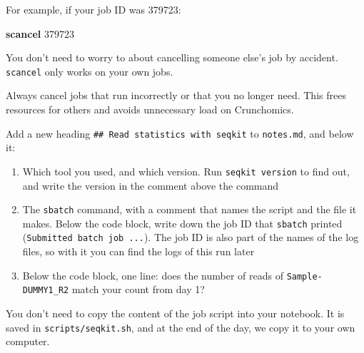 \documentclass[
  letterpaper,
  DIV=11,
  numbers=noendperiod]{scrreprt}
\newenvironment{Shaded}{}{}
\newcommand{\ExtensionTok}[1]{\textcolor[rgb]{0.84,0.23,0.29}{\textbf{#1}}}
\newcommand{\NormalTok}[1]{\textcolor[rgb]{0.14,0.16,0.18}{#1}}
\providecommand{\tightlist}{%
  \setlength{\itemsep}{0pt}\setlength{\parskip}{0pt}}
\begin{document}
For example, if your job ID was 379723:

\begin{Shaded}
\begin{Highlighting}[]
\ExtensionTok{scancel}\NormalTok{ 379723}
\end{Highlighting}
\end{Shaded}

You don't need to worry to about cancelling someone else's job by
accident. \texttt{scancel} only works on your own jobs.

\begin{tcolorbox}[enhanced jigsaw, colbacktitle=quarto-callout-tip-color!10!white, rightrule=.15mm, leftrule=.75mm, colback=white, opacitybacktitle=0.6, title=\textcolor{quarto-callout-tip-color}{\faLightbulb}\hspace{0.5em}{Tip: Good HPC etiquette}, bottomrule=.15mm, left=2mm, colframe=quarto-callout-tip-color-frame, opacityback=0, breakable, bottomtitle=1mm, coltitle=black, arc=.35mm, toprule=.15mm, toptitle=1mm, titlerule=0mm]

Always cancel jobs that run incorrectly or that you no longer need. This
frees resources for others and avoids unnecessary load on Crunchomics.

\end{tcolorbox}

\begin{tcolorbox}[enhanced jigsaw, colbacktitle=quarto-callout-color!10!white, rightrule=.15mm, leftrule=.75mm, colback=white, opacitybacktitle=0.6, title=\textcolor{quarto-callout-color}{\faInfo}\hspace{0.5em}{Notebook checkpoint: Read statistics with seqkit}, bottomrule=.15mm, left=2mm, colframe=quarto-callout-color-frame, opacityback=0, breakable, bottomtitle=1mm, coltitle=black, arc=.35mm, toprule=.15mm, toptitle=1mm, titlerule=0mm]

Add a new heading \texttt{\#\#\ Read\ statistics\ with\ seqkit} to
\texttt{notes.md}, and below it:

\begin{enumerate}
\def\labelenumi{\arabic{enumi}.}
\tightlist
\item
  Which tool you used, and which version. Run \texttt{seqkit\ version}
  to find out, and write the version in the comment above the command
\item
  The \texttt{sbatch} command, with a comment that names the script and
  the file it makes. Below the code block, write down the job ID that
  \texttt{sbatch} printed (\texttt{Submitted\ batch\ job\ ...}). The job
  ID is also part of the names of the log files, so with it you can find
  the logs of this run later
\item
  Below the code block, one line: does the number of reads of
  \texttt{Sample-DUMMY1\_R2} match your count from day 1?
\end{enumerate}

You don't need to copy the content of the job script into your notebook.
It is saved in \texttt{scripts/seqkit.sh}, and at the end of the day, we
copy it to your own computer.

\end{tcolorbox}
\end{document}
